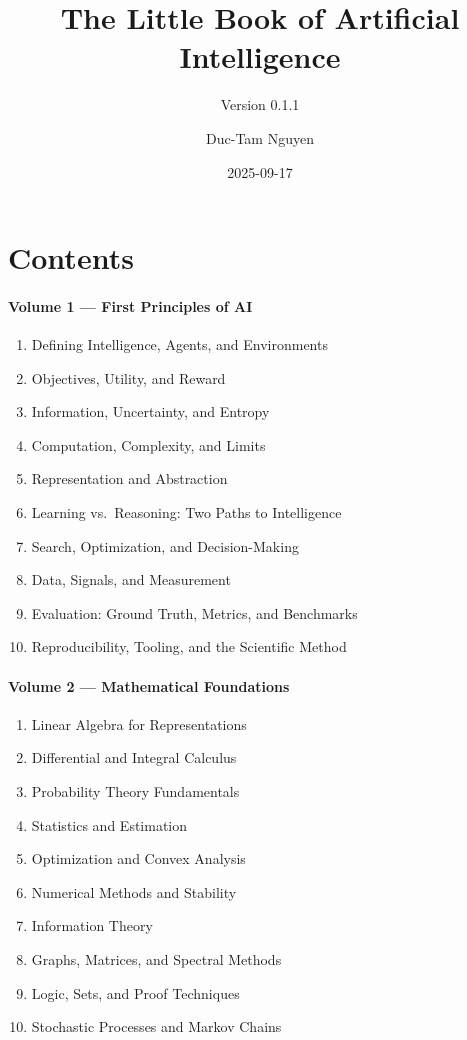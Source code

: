 \documentclass[
  letterpaper,
  DIV=11,
  numbers=noendperiod]{scrreprt}
\title{The Little Book of Artificial Intelligence}
\subtitle{Version 0.1.1}
\author{Duc-Tam Nguyen}
\date{2025-09-17}
\providecommand{\tightlist}{%
  \setlength{\itemsep}{0pt}\setlength{\parskip}{0pt}}
\renewcommand*\contentsname{Table of contents}
\newcommand\contentsname{Table of contents}
\begin{document}
\maketitle

\renewcommand*\contentsname{Table of contents}
{
\hypersetup{linkcolor=}
\setcounter{tocdepth}{2}
\tableofcontents
}


\chapter{Contents}\label{contents}

\subsubsection{Volume 1 --- First Principles of
AI}\label{volume-1-first-principles-of-ai}

\begin{enumerate}
\def\labelenumi{\arabic{enumi}.}
\tightlist
\item
  Defining Intelligence, Agents, and Environments
\item
  Objectives, Utility, and Reward
\item
  Information, Uncertainty, and Entropy
\item
  Computation, Complexity, and Limits
\item
  Representation and Abstraction
\item
  Learning vs.~Reasoning: Two Paths to Intelligence
\item
  Search, Optimization, and Decision-Making
\item
  Data, Signals, and Measurement
\item
  Evaluation: Ground Truth, Metrics, and Benchmarks
\item
  Reproducibility, Tooling, and the Scientific Method
\end{enumerate}

\subsubsection{Volume 2 --- Mathematical
Foundations}\label{volume-2-mathematical-foundations}

\begin{enumerate}
\def\labelenumi{\arabic{enumi}.}
\setcounter{enumi}{10}
\tightlist
\item
  Linear Algebra for Representations
\item
  Differential and Integral Calculus
\item
  Probability Theory Fundamentals
\item
  Statistics and Estimation
\item
  Optimization and Convex Analysis
\item
  Numerical Methods and Stability
\item
  Information Theory
\item
  Graphs, Matrices, and Spectral Methods
\item
  Logic, Sets, and Proof Techniques
\item
  Stochastic Processes and Markov Chains
\end{enumerate}
\end{document}
